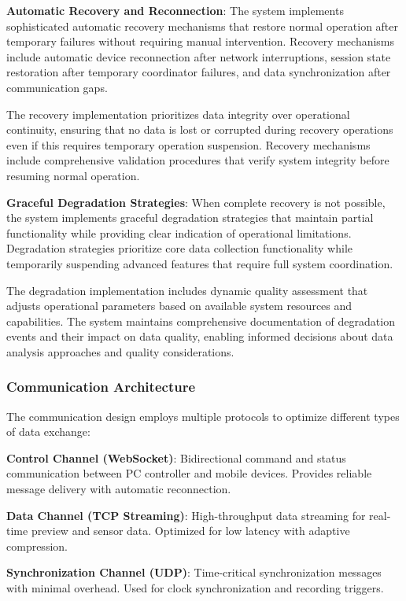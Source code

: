 \documentclass[12pt,a4paper]{article}
\begin{document}
\textbf{Automatic Recovery and Reconnection}: The system implements sophisticated automatic recovery mechanisms that restore
normal operation after temporary failures without requiring manual intervention. Recovery mechanisms include automatic
device reconnection after network interruptions, session state restoration after temporary coordinator failures, and
data synchronization after communication gaps.

The recovery implementation prioritizes data integrity over operational continuity, ensuring that no data is lost or
corrupted during recovery operations even if this requires temporary operation suspension. Recovery mechanisms include
comprehensive validation procedures that verify system integrity before resuming normal operation.

\textbf{Graceful Degradation Strategies}: When complete recovery is not possible, the system implements graceful degradation
strategies that maintain partial functionality while providing clear indication of operational limitations. Degradation
strategies prioritize core data collection functionality while temporarily suspending advanced features that require
full system coordination.

The degradation implementation includes dynamic quality assessment that adjusts operational parameters based on
available system resources and capabilities. The system maintains comprehensive documentation of degradation events and
their impact on data quality, enabling informed decisions about data analysis approaches and quality considerations.

\subsubsection{Communication Architecture}

The communication design employs multiple protocols to optimize different types of data exchange:

\textbf{Control Channel (WebSocket)}: Bidirectional command and status communication between PC controller and mobile
devices. Provides reliable message delivery with automatic reconnection.

\textbf{Data Channel (TCP Streaming)}: High-throughput data streaming for real-time preview and sensor data. Optimized for
low latency with adaptive compression.

\textbf{Synchronization Channel (UDP)}: Time-critical synchronization messages with minimal overhead. Used for clock
synchronization and recording triggers.
\end{document}
